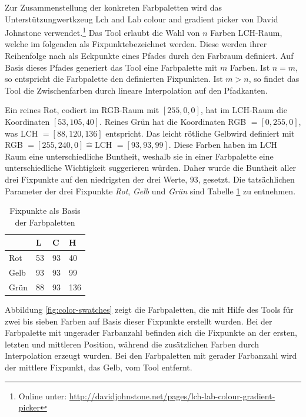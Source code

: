 Zur Zusammenstellung der konkreten Farbpaletten wird das Unterstützungwertkzeug \glqq Lch and Lab colour and gradient picker\grqq{} von David Johnstone verwendet.\footnote{Online unter: \url{http://davidjohnstone.net/pages/lch-lab-colour-gradient-picker}} Das Tool erlaubt die Wahl von $n$ Farben LCH-Raum, welche im folgenden als \glqq Fixpunkte\grqq bezeichnet werden. Diese werden ihrer Reihenfolge nach als Eckpunkte eines Pfades durch den Farbraum definiert. Auf Basis dieses Pfades generiert das Tool eine Farbpalette mit $m$ Farben. Ist $n = m$, so entspricht die Farbpalette den definierten Fixpunkten. Ist $m > n$, so findet das Tool die Zwischenfarben durch lineare Interpolation auf den Pfadkanten.

Ein \glqq reines Rot\grqq, codiert im RGB-Raum mit $[255,0,0]$, hat im LCH-Raum die Koordinaten $[53,105,40]$. \glqq Reines Grün\grqq{} hat die Koordinaten RGB $=[0,255,0]$, was LCH $= [88,120,136]$ entspricht. Das \glqq leicht rötliche Gelb\grqq wird definiert mit RGB $=[255,240,0] \hat{=}$LCH $= [93,93,99]$. Diese Farben haben im LCH Raum eine unterschiedliche Buntheit, weshalb sie in einer Farbpalette eine unterschiedliche Wichtigkeit suggerieren würden.\cite{bigman} Daher wurde die Buntheit aller drei Fixpunkte auf den niedrigsten der drei Werte, $93$, gesetzt. Die tatsächlichen Parameter der drei Fixpunkte \emph{Rot}, \emph{Gelb} und \emph{Grün} sind Tabelle \ref{tab:fixpoints} zu entnehmen. 

\begin{table}[h]
\centering
\caption{Fixpunkte als Basis der Farbpaletten}
\label{tab:fixpoints}
\begin{tabular}{@{}llll@{}}
\toprule
                                     & L      & C     & H      \\ \midrule
Rot   & 53     & 93    & 40     \\
Gelb  & 93     & 93    & 99     \\
Grün  & 88     & 93    & 136    \\ \bottomrule
\end{tabular}
\end{table}

Abbildung \ref{fig:color-swatches} zeigt die Farbpaletten, die mit Hilfe des Tools für zwei bis sieben Farben auf Basis dieser Fixpunkte erstellt wurden. Bei der Farbpalette mit ungerader Farbanzahl befinden sich die Fixpunkte an der ersten, letzten und mittleren Position, während die zusätzlichen Farben durch Interpolation erzeugt wurden. Bei den Farbpaletten mit gerader Farbanzahl wird der mittlere Fixpunkt, das Gelb, vom Tool entfernt.

